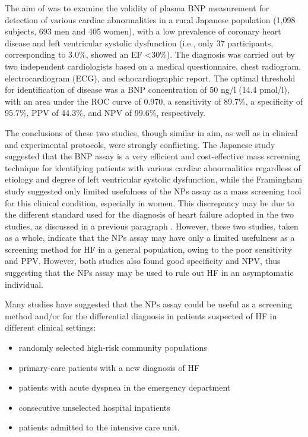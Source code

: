 \documentclass[14pt,a4paper,onecolumn]{extarticle}
\begin{document}
The aim of \citep{bib366} was to examine the validity of plasma BNP measurement for detection of various cardiac abnormalities in a rural Japanese population (1,098 subjects, 693 men and 405 women), with a low prevalence of coronary heart disease and left ventricular systolic dysfunction (i.e., only 37 participants, corresponding to 3.0\%, showed an EF <30\%). The diagnosis was carried out by two independent cardiologists based on a medical questionnaire, chest radiogram, electrocardiogram (ECG), and echocardiographic report. The optimal threshold for identification of disease was a BNP concentration of 50 ng/l (14.4 pmol/l), with an area under the ROC curve of 0.970, a sensitivity of 89.7\%, a specificity of 95.7\%, PPV of 44.3\%, and NPV of 99.6\%, respectively.

The conclusions of these two studies, though similar in aim, as well as in clinical and experimental protocols, were strongly conflicting. The Japanese study suggested that the BNP assay is a very efficient and cost-effective mass screening technique for identifying patients with various cardiac abnormalities regardless of etiology and degree of left ventricular systolic dysfunction, while the Framingham study suggested only limited usefulness of the NPs assay as a mass screening tool for this clinical condition, especially in women.  This discrepancy may be due to the different standard used for the diagnosis of heart failure adopted in the two studies, as discussed in a previous paragraph . However, these two studies, taken as a whole, indicate that the NPs assay may have only a limited usefulness as a screening method for HF in a general population, owing to the poor sensitivity and PPV. However, both studies also found good specificity and NPV, thus suggesting that the NPs assay may be used to rule out HF in an asymptomatic individual.

Many studies have suggested that the NPs assay could be useful as a screening method and/or for the differential diagnosis in patients suspected of HF in different clinical settings: \begin{itemize} \item randomly selected high-risk community populations \item primary-care patients with a new diagnosis of HF \item patients with acute dyspnea in the emergency department \item consecutive unselected hospital inpatients \item patients admitted to the intensive care unit.  \end{itemize}
\end{document}
